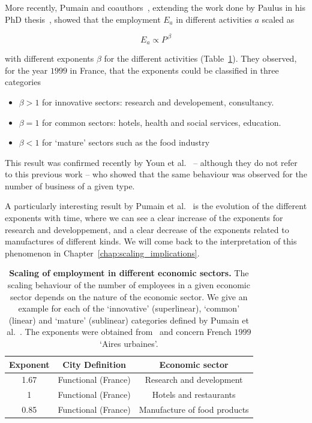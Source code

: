 More recently, Pumain and coauthors~\cite{Pumain:2006}, extending the work done
by Paulus in his PhD thesis~\cite{Paulus:2004}, showed that the
employment $E_a$ in different activities $a$ scaled as

\begin{equation}
    E_a \propto P^{\,\beta}
\end{equation}

with different exponents $\beta$ for the different activities
(Table~\ref{tab:employment}). They observed,
for the year $1999$ in France, that the exponents could be classified in three
categories

\begin{itemize}
    \item $\beta > 1$ for innovative sectors: research and developement,
        consultancy.
    \item $\beta = 1$ for common sectors: hotels, health and social services,
        education.
    \item $\beta < 1$ for `mature' sectors such as the food industry
\end{itemize}

This result was confirmed recently by Youn et al.~\cite{Youn:2014} -- although
they do not refer to this previous work -- who showed that the same behaviour was
observed for the number of business of a given type. 

A particularly interesting result by Pumain et al.~\cite{Pumain:2006} is
the evolution of the different exponents with time, where we can see a clear
increase of the exponents for research and developpement, and a clear decrease
of the exponents related to manufactures of different kinds. We will come back
to the interpretation of this phenomenon in
Chapter~\ref{chap:scaling_implications}.\\

\begin{table}[!h]
    \centering
\begin{tabular}{|ccc|}
\hline
Exponent & City Definition & Economic sector\\
\hline
1.67 & Functional (France) & Research and development\\
1 & Functional (France) & Hotels and restaurants \\
0.85 & Functional (France) & Manufacture of food products\\
\hline
\end{tabular}
\caption{{\bf Scaling of employment in different economic sectors.} The scaling
behaviour of the number of employees in a given economic sector depends on the
nature of the 
economic sector. We give an example for each of the `innovative'
(superlinear), `common' (linear) and `mature' (sublinear) categories defined by
Pumain et al.~\cite{Pumain:2006}. The exponents were obtained from~\cite{Pumain:2006} and concern
French $1999$ `Aires urbaines'.} 
\label{tab:employment} 
\end{table}

